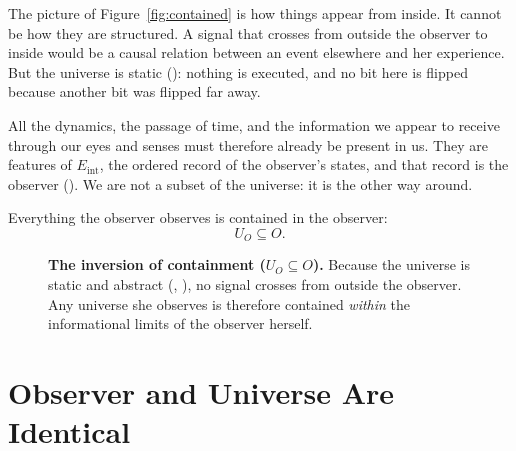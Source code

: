 \documentclass[11pt]{book}
\begin{document}
The picture of Figure~\ref{fig:contained} is how things appear from
inside. It cannot be how they are structured. A signal that crosses from
outside the observer to inside would be a causal relation between an event
elsewhere and her experience. But the universe is static
(): nothing is executed, and no bit here is flipped
because another bit was flipped far away.

All the dynamics, the passage of time, and the information we appear to
receive through our eyes and senses must therefore already be present in
us. They are features of $E_{\mathrm{int}}$, the ordered record of the
observer's states, and that record is the observer ().
We are not a subset of the universe: it is the other way around.

\begin{deduction}\label{ded:inversion}
  Everything the observer observes is contained in the observer:
  \[
    U_O \subseteq O.
  \]
\end{deduction}



\begin{figure}[htbp]
\centering
{}
\caption{\textbf{The inversion of containment ($U_O \subseteq O$).}
  Because the universe is static and abstract (,
  ), no signal crosses from outside the observer. Any
  universe she observes is therefore contained \emph{within} the
  informational limits of the observer herself.}
\label{fig:inverted}
\end{figure}


\section{Observer and Universe Are Identical}
\label{sec:identity}
\end{document}
